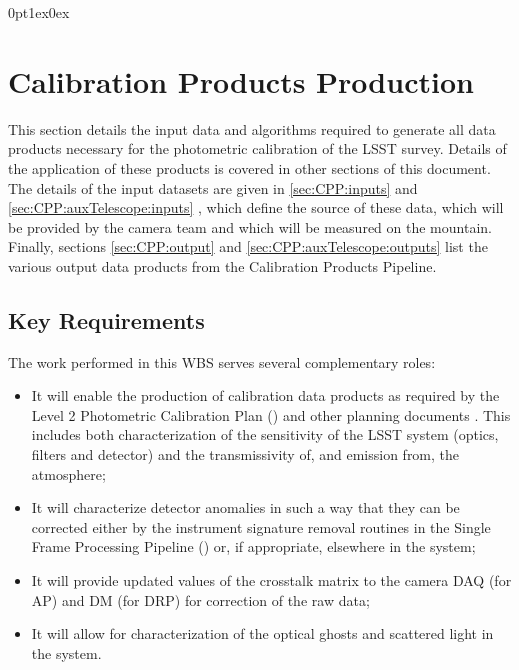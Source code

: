 \titlespacing*{\subsubsection}
{0pt}{1ex}{0ex}


\section{Calibration Products Production}
\label{sec:cpp}

This section details the input data and algorithms required to generate all data products necessary for the photometric calibration of the LSST survey. Details of the application of these products is covered in other sections of this document. The details of the input datasets are given in \secsymbol\ref{sec:CPP:inputs} and  \secsymbol\ref{sec:CPP:auxTelescope:inputs} , which define the source of these data, \ie which will be provided by the camera team and which will be measured on the mountain. Finally, sections \secsymbol\ref{sec:CPP:output} and \secsymbol\ref{sec:CPP:auxTelescope:outputs} list the various output data products from the Calibration Products Pipeline.

\subsection{Key Requirements}
\label{sec:CPP:keyRequirements}
The work performed in this WBS serves several complementary roles:

\begin{itemize}
 \item It will enable the production of calibration data products as required by the Level 2 Photometric Calibration Plan (\NewPCP{}) and other planning documents \cite{Lupton15}. This includes both characterization of the sensitivity of the LSST system (optics, filters and detector) and the transmissivity of, and emission from, the atmosphere;

 \item It will characterize detector anomalies in such a way that they can be corrected either by the instrument signature removal routines in the Single Frame Processing Pipeline (\wbsSFM) or, if appropriate, elsewhere in the system;

 \item It will provide updated values of the crosstalk matrix to the camera DAQ (for AP) and DM (for DRP) for correction of the raw data;

 \item It will allow for characterization of the optical ghosts and scattered light in the system.
\end{itemize}


